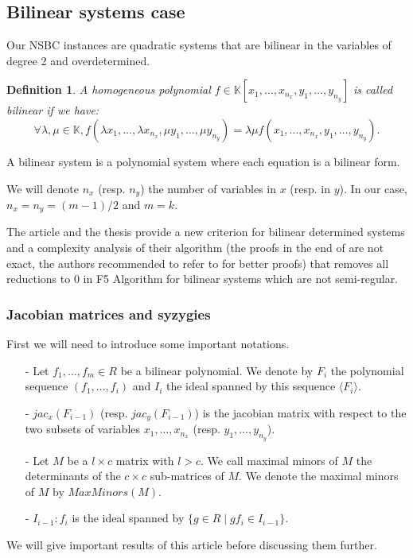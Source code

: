 \documentclass[english]{article}
\newtheorem{definition}{Definition}[section]
\begin{document}
		\subsection{Bilinear systems case}
		Our NSBC instances are quadratic systems that are bilinear in the variables of degree 2 and overdetermined.
		
		\begin{definition}
			A homogeneous polynomial $f \in \mathbb{K}[x_1,\dots,x_{n_x},y_1,\dots,y_{n_y}]$ is called bilinear if we have:
			$$
			\forall \lambda, \mu \in \mathbb{K}, f(\lambda x_1,\dots,\lambda x_{n_x}, \mu y_1,\dots, \mu y_{n_y}) = \lambda \mu f(x_1,\dots,x_{n_x},y_1,\dots,y_{n_y}).
			$$
		\end{definition}
		
		A bilinear system is a polynomial system where each equation is a bilinear form.
		
		We will denote $n_x$ (resp. $n_y$) the number of variables in $x$ (resp. in $y$). In our case, $n_x = n_y = (m-1)/2$ and $m = k$.
		
		The article \cite{FSS11} and the thesis \cite{Spaen2012} provide a new criterion for bilinear determined systems and a complexity analysis of their algorithm (the proofs in the end of \cite{FSS11} are not exact, the authors recommended to refer to \cite{Spaen2012} for better proofs) that removes all reductions to 0 in F5 Algorithm for bilinear systems which are not semi-regular.
		
		\subsubsection{Jacobian matrices and syzygies}
		First we will need to introduce some important notations.
		\begin{itemize}
			\item[-] Let $f_1,...,f_m \in R$ be a bilinear polynomial. We denote by $F_i$ the polynomial sequence $(f_1,...,f_i)$ and $I_i$ the ideal spanned by this sequence $\langle F_i \rangle$.
			\item[-] $jac_{x}(F_{i-1})$ (resp. $jac_{y}(F_{i-1})$) is the jacobian matrix with respect to the two subsets of variables $x_1,...,x_{n_x}$ (resp. $y_1,...,y_{n_y}$).
			\item[-] Let $M$ be a $l \times c$ matrix with $l > c$. We call maximal minors of $M$ the determinants of the $c \times c$ sub-matrices of $M$. We denote the maximal minors of $M$ by $MaxMinors(M)$.
			\item[-] $I_{i-1} : f_i$ is the ideal spanned by $\{g \in R \mid gf_i \in I_{i-1}\}$.
		\end{itemize}
		We will give important results of this article before discussing them further.
		
\end{document}
